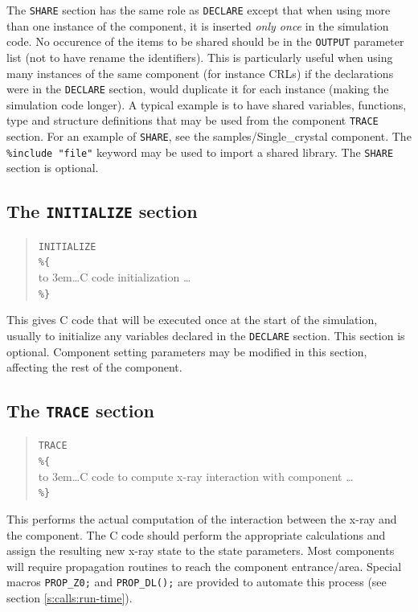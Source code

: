 The \texttt{SHARE} section has the same role as \texttt{DECLARE} except that when using more than one instance of the component, it is inserted \emph{only once} in the simulation
code. No occurence of the items to be shared should be in the \texttt{OUTPUT} parameter list (not to have \MCX rename the identifiers).
This is particularly useful when using many instances of the same component (for instance CRLs) if the declarations were in the \texttt{DECLARE} section, \MCX would
duplicate it for each instance (making the simulation code longer).
A typical example is to have shared variables, functions, type and structure definitions that may be used from the component \texttt{TRACE} section. For an
example of \texttt{SHARE}, see the samples/Single\_crystal
component. The \verb+%include "file"+ keyword may be used to import
a shared library. The \texttt{SHARE} section is optional.

\subsection{The \texttt{INITIALIZE} section}
\label{s:comp-initialize}

\begin{quote}
  \texttt{INITIALIZE} \\
  \verb|%{| \\
  \hbox to 3em{}\ldots C code initialization \ldots \\
  \verb|%}|
\end{quote}
This gives C code that will be executed once at the start of the
simulation, usually to initialize any variables declared in the
\texttt{DECLARE} section. This section is optional. Component setting parameters may be modified in this section, affecting the rest of the component.


\subsection{The \texttt{TRACE} section}
\label{s:comp-trace}

\begin{quote}
  \texttt{TRACE} \\
  \verb|%{| \\
  \hbox to 3em{}\ldots C code to compute x-ray interaction with
    component \ldots \\
  \verb|%}|
\end{quote}
This performs the actual computation of the interaction between the
x-ray and the component. The C code should perform the appropriate
calculations and assign the resulting new x-ray state to the state
parameters. Most components will require propagation routines to reach the component entrance/area. Special macros \verb+PROP_Z0;+ and \verb+PROP_DL();+ are provided to automate this process (see section \ref{s:calls:run-time}).


